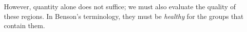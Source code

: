 However, quantity alone does not suffice; we must also evaluate the quality of these regions. In Benson's terminology, they must be \textit{healthy} for the groups that contain them. 
%					
%					
%					
%		
%		
